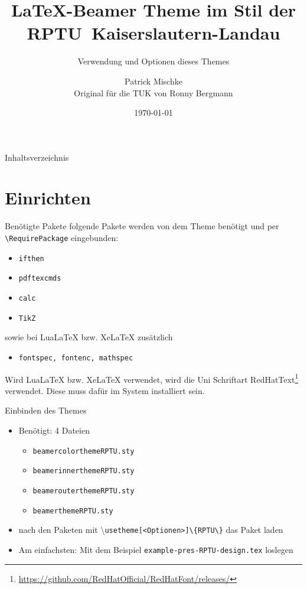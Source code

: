 \documentclass[german,10pt,xcolor=colortbl,compress
]{beamer}
\title{\LaTeX-Beamer Theme im Stil der \mbox{RPTU Kaiserslautern-Landau}}
\subtitle{Verwendung und Optionen dieses Themes}
\date[]{\today}
\author[P. Mischke]{Patrick Mischke\\Original für die TUK von Ronny Bergmann}
\institute[]{AG Ott\\FB Physik\\RPTU Kaiserslautern}
\begin{document}
\maketitle
\begin{frame}{Inhaltsverzeichnis}
	\tableofcontents
\end{frame}
\section{Einrichten}
\begin{frame}[fragile]{Benötigte Pakete}
	folgende Pakete werden von dem Theme benötigt und per \lstinline!\RequirePackage! eingebunden:
	\begin{itemize}
		\item \lstinline!ifthen!
		\item \lstinline!pdftexcmds!
		\item \lstinline!calc!
		\item \lstinline!TikZ!
	\end{itemize}\vspace{\baselineskip}
	sowie bei LuaLaTeX bzw. XeLaTeX zusätzlich
	\begin{itemize}
		\item \lstinline!fontspec, fontenc, mathspec!
	\end{itemize}\vspace{\baselineskip}
	Wird LuaLaTeX bzw. XeLaTeX verwendet, wird die Uni Schriftart RedHatText\footnote{\url{https://github.com/RedHatOfficial/RedHatFont/releases/}} verwendet.
	Diese muss dafür im System installiert sein.
\end{frame}
\begin{frame}{Einbinden des Themes}
	\begin{itemize}
		\item Benötigt: 4 Dateien
		      \begin{itemize}
			      \item \lstinline|beamercolorthemeRPTU.sty|
			      \item \lstinline|beamerinnerthemeRPTU.sty|
			      \item \lstinline!beamerouterthemeRPTU.sty!
			      \item \lstinline|beamerthemeRPTU.sty|
		      \end{itemize}

		\item nach den Paketen mit \textbackslash\lstinline|usetheme[<Optionen>]\{RPTU\}| das Paket laden
		\item Am einfachsten: Mit dem Beispiel \lstinline!example-pres-RPTU-design.tex! loslegen
	\end{itemize}
\end{frame}
\end{document}
